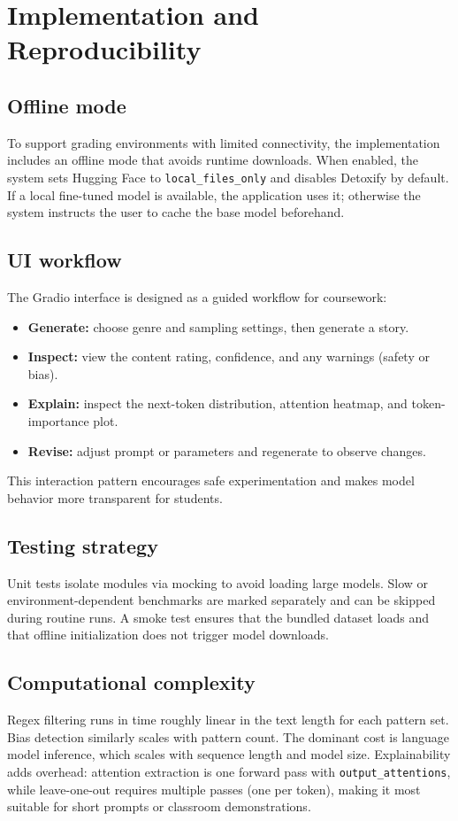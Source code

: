\documentclass[conference]{IEEEtran}
\begin{document}
\section{Implementation and Reproducibility}
\subsection{Offline mode}
To support grading environments with limited connectivity, the implementation includes an offline mode that avoids runtime downloads. When enabled, the system sets Hugging Face to \texttt{local\_files\_only} and disables Detoxify by default. If a local fine-tuned model is available, the application uses it; otherwise the system instructs the user to cache the base model beforehand.

\subsection{UI workflow}
The Gradio interface is designed as a guided workflow for coursework:
\begin{itemize}
    \item \textbf{Generate:} choose genre and sampling settings, then generate a story.
    \item \textbf{Inspect:} view the content rating, confidence, and any warnings (safety or bias).
    \item \textbf{Explain:} inspect the next-token distribution, attention heatmap, and token-importance plot.
    \item \textbf{Revise:} adjust prompt or parameters and regenerate to observe changes.
\end{itemize}
This interaction pattern encourages safe experimentation and makes model behavior more transparent for students.

\subsection{Testing strategy}
Unit tests isolate modules via mocking to avoid loading large models. Slow or environment-dependent benchmarks are marked separately and can be skipped during routine runs. A smoke test ensures that the bundled dataset loads and that offline initialization does not trigger model downloads.

\subsection{Computational complexity}
Regex filtering runs in time roughly linear in the text length for each pattern set. Bias detection similarly scales with pattern count. The dominant cost is language model inference, which scales with sequence length and model size. Explainability adds overhead: attention extraction is one forward pass with \texttt{output\_attentions}, while leave-one-out requires multiple passes (one per token), making it most suitable for short prompts or classroom demonstrations.
\end{document}
